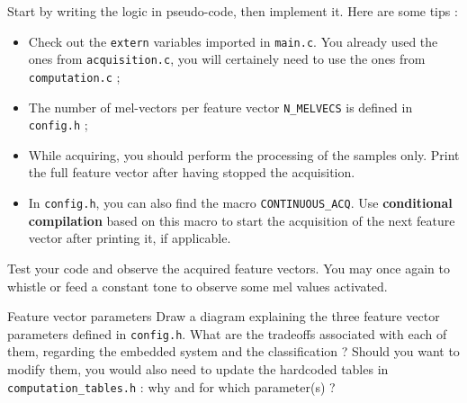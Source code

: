 Start by writing the logic in pseudo-code, then implement it. Here are some tips :
\begin{itemize}
    \item Check out the \texttt{extern} variables imported in \texttt{main.c}. You already used the ones from \texttt{acquisition.c}, you will certainely need to use the ones from \texttt{computation.c} ;
    \item The number of mel-vectors per feature vector \texttt{N\_MELVECS} is defined in \texttt{config.h} ;
    \item While acquiring, you should perform the processing of the samples only. Print the full feature vector after having stopped the acquisition.
    \item In \texttt{config.h}, you can also find the macro \texttt{CONTINUOUS\_ACQ}. Use \textbf{conditional compilation} based on this macro to start the acquisition of the next feature vector after printing it, if applicable.
\end{itemize}

Test your code and observe the acquired feature vectors. You may once again to whistle or feed a constant tone to observe some mel values activated.

\begin{bclogo}[couleur = gray!20, arrondi = 0.2, logo=\bcquestion]{Feature vector parameters}
Draw a diagram explaining the three feature vector parameters defined in \texttt{config.h}. What are the tradeoffs associated with each of them, regarding the embedded system and the classification ? Should you want to modify them, you would also need to update the hardcoded tables in \texttt{computation\_tables.h} : why and for which parameter(s) ?
\end{bclogo}
